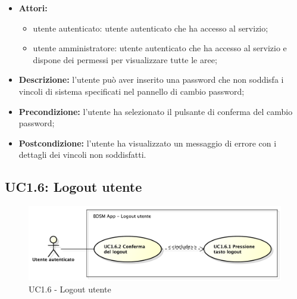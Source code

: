 \begin{itemize}
   	\item \textbf{Attori:}
    \begin{itemize}
    	\item utente autenticato: utente autenticato che ha accesso al servizio;
    	\item utente amministratore: utente autenticato che ha accesso al servizio e dispone dei permessi per visualizzare tutte le aree;
	\end{itemize}
    \item \textbf{Descrizione:} l'utente può aver inserito una password che non soddisfa i vincoli di sistema specificati nel pannello di cambio password;
    \item \textbf{Precondizione:} l'utente ha selezionato il pulsante di conferma del cambio password;
    \item \textbf{Postcondizione:} l'utente ha visualizzato un messaggio di errore con i dettagli dei vincoli non soddisfatti.
\end{itemize}

\pagebreak


\subsection{UC1.6: Logout utente}

\begin{figure}[htbp]
    \centering
    \centerline{\includegraphics[scale=0.5]{./images/UC1_6.pdf}}
    \caption{UC1.6 - Logout utente}
\end{figure}

